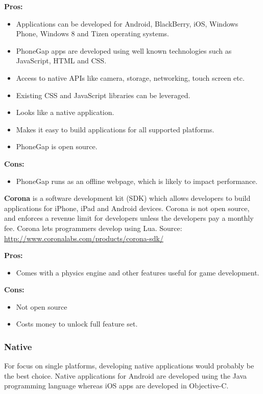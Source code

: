 \indent
  {\bf Pros:}
  \begin{itemize}
    \item Applications can be developed for Android, BlackBerry, iOS,
          Windows Phone, Windows 8 and Tizen operating systems.
    \item PhoneGap apps are developed using well known technologies such as
          JavaScript, HTML and CSS.
    \item Access to native APIs like camera, storage, networking,
          touch screen etc.
    \item Existing CSS and JavaScript libraries can be leveraged.
    \item Looks like a native application.
    \item Makes it easy to build applications for all supported platforms.
    \item PhoneGap is open source.
  \end{itemize}

\indent
{\bf Cons:}
  \begin{itemize}
    \item PhoneGap runs as an offline webpage, which is likely to impact
          performance.
  \end{itemize}

\noindent
{\bf Corona} is a software development kit (SDK) which allows developers to
build applications for iPhone, iPad and Android devices. Corona is not open
source, and enforces a revenue limit for developers unless the developers pay a
monthly fee. Corona lets programmers develop using Lua.
Source: \url{http://www.coronalabs.com/products/corona-sdk/}

\indent
  {\bf Pros:}
  \begin{itemize}
    \item Comes with a physics engine and other features useful for game
          development.
  \end{itemize}

\indent
  {\bf Cons:}
  \begin{itemize}
    \item Not open source
    \item Costs money to unlock full feature set.
  \end{itemize}

\subsubsection{Native}
For focus on single platforms, developing native applications would probably be
the best choice. Native applications for Android are developed using the Java
programming language whereas iOS apps are developed in Objective-C.

